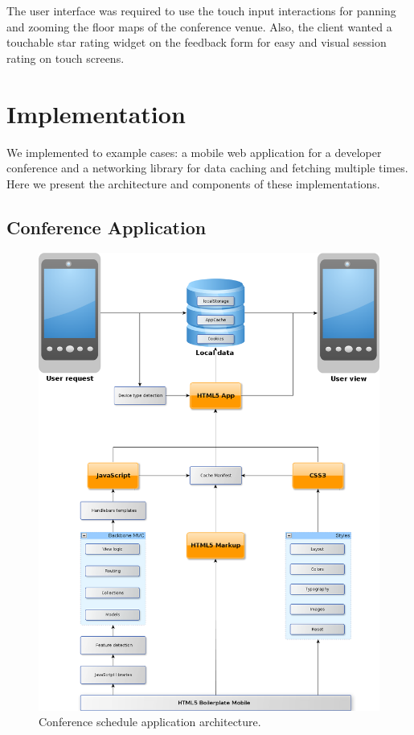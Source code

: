The user interface was required to use the touch input interactions
for panning and zooming the floor maps of the conference venue. Also,
the client wanted a touchable star rating widget on the feedback form
for easy and visual session rating on touch screens.


\chapter{Implementation}
\label{chapter:implementation}

We implemented to example cases: a mobile web application for a
developer conference and a networking library for data caching and
fetching multiple times. Here we present the architecture and
components of these implementations.

\section{Conference Application}

\begin{figure}[ht]
  \begin{center}
    \includegraphics[width=\textwidth]{images/devdays.png}
    \caption{Conference schedule application architecture.}
    \label{figure:devdays.png}
  \end{center}
\end{figure}

